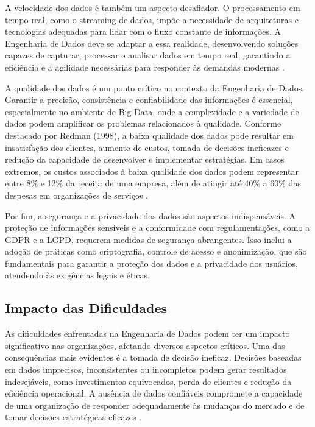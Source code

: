 A velocidade dos dados é também um aspecto desafiador. O processamento em tempo real, como o streaming de dados, 
impõe a necessidade de arquiteturas e tecnologias adequadas para lidar com o fluxo constante de informações. 
A Engenharia de Dados deve se adaptar a essa realidade, desenvolvendo soluções capazes de capturar, processar 
e analisar dados em tempo real, garantindo a eficiência e a agilidade necessárias para responder às demandas modernas \cite{lheureux2017machine}.

A qualidade dos dados é um ponto crítico no contexto da Engenharia de Dados. Garantir a precisão, consistência e 
confiabilidade das informações é essencial, especialmente no ambiente de Big Data, onde a complexidade e a variedade 
de dados podem amplificar os problemas relacionados à qualidade. Conforme destacado por Redman (1998), a baixa 
qualidade dos dados pode resultar em insatisfação dos clientes, aumento de custos, tomada de decisões ineficazes 
e redução da capacidade de desenvolver e implementar estratégias. Em casos extremos, os custos associados à baixa 
qualidade dos dados podem representar entre 8\% e 12\% da receita de uma empresa, além de atingir até 40\% a 60\% das 
despesas em organizações de serviços \cite{impact_poor_data_1998}.

Por fim, a segurança e a privacidade dos dados são aspectos indispensáveis. A proteção de informações sensíveis e 
a conformidade com regulamentações, como a GDPR e a LGPD, requerem medidas de segurança abrangentes. Isso inclui 
a adoção de práticas como criptografia, controle de acesso e anonimização, que são fundamentais para garantir a 
proteção dos dados e a privacidade dos usuários, atendendo às exigências legais e éticas.

\subsection{Impacto das Dificuldades}

As dificuldades enfrentadas na Engenharia de Dados podem ter um impacto significativo nas organizações, afetando 
diversos aspectos críticos. Uma das consequências mais evidentes é a tomada de decisão ineficaz. Decisões baseadas 
em dados imprecisos, inconsistentes ou incompletos podem gerar resultados indesejáveis, como investimentos equivocados, 
perda de clientes e redução da eficiência operacional. A ausência de dados confiáveis compromete a capacidade de uma 
organização de responder adequadamente às mudanças do mercado e de tomar decisões estratégicas eficazes \cite{stone2019information}.

